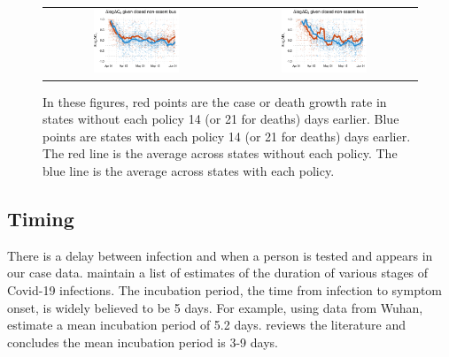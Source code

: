 \documentclass[3p, longtitle]{elsarticle}
\theoremstyle{definition}
\begin{document}
\begin{figure}
\begin{minipage}{\linewidth}
\begin{tabular}{cc}
      \\
      \includegraphics[width=0.483\textwidth]{tables_and_figures/pnonessential-cases-14}
      &
        \includegraphics[width=0.483\textwidth]{tables_and_figures/pnonessential-deaths-21}
    \end{tabular}
  \end{minipage}
     \begin{flushleft}
      \footnotesize  In these figures, red points are the case or death
      growth rate in states without each policy 14 (or 21 for deaths)
      days earlier.  Blue points are states with each policy 14 (or 21
      for deaths) days earlier.  The red line is the average across
      states without each policy. The blue line is the average across
      states with each policy.    \end{flushleft}
\end{figure}

\subsection{Timing\label{sec:timing}}

There is a delay between infection and when a person is tested and
appears in our case data. \cite{midas2020} maintain a list of
estimates of the duration of various stages of Covid-19
infections. The incubation period, the time from infection to symptom
onset, is widely believed to be 5 days. For example, using data from
Wuhan, \cite{li2020} estimate a mean incubation period of 5.2 days.
\cite{siorda2020} reviews the literature and concludes the mean
incubation period is 3-9 days.
\end{document}
